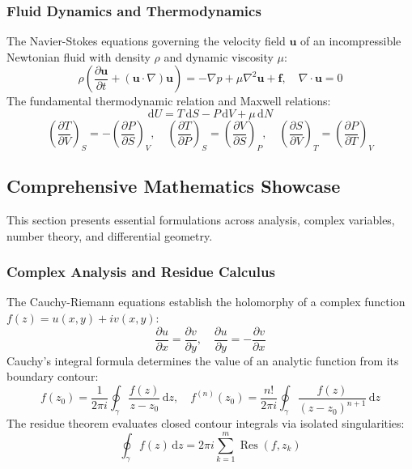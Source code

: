\documentclass[11pt, a4paper]{article}
\begin{document}
\subsubsection{Fluid Dynamics and Thermodynamics}
The Navier-Stokes equations governing the velocity field $\mathbf{u}$ of an incompressible Newtonian fluid with density $\rho$ and dynamic viscosity $\mu$:
\begin{equation}
\rho \left( \frac{\partial \mathbf{u}}{\partial t} + (\mathbf{u} \cdot \nabla) \mathbf{u} \right) = -\nabla p + \mu \nabla^2 \mathbf{u} + \mathbf{f}, \quad \nabla \cdot \mathbf{u} = 0
\end{equation}
The fundamental thermodynamic relation and Maxwell relations:
\begin{equation}
\mathrm{d}U = T \, \mathrm{d}S - P \, \mathrm{d}V + \mu \, \mathrm{d}N
\end{equation}
\begin{equation}
\left( \frac{\partial T}{\partial V} \right)_S = -\left( \frac{\partial P}{\partial S} \right)_V, \quad \left( \frac{\partial T}{\partial P} \right)_S = \left( \frac{\partial V}{\partial S} \right)_P, \quad \left( \frac{\partial S}{\partial V} \right)_T = \left( \frac{\partial P}{\partial T} \right)_V
\end{equation}

\subsection{Comprehensive Mathematics Showcase}
This section presents essential formulations across analysis, complex variables, number theory, and differential geometry.

\subsubsection{Complex Analysis and Residue Calculus}
The Cauchy-Riemann equations establish the holomorphy of a complex function $f(z) = u(x, y) + i v(x, y)$:
\begin{equation}
\frac{\partial u}{\partial x} = \frac{\partial v}{\partial y}, \quad \frac{\partial u}{\partial y} = -\frac{\partial v}{\partial x}
\end{equation}
Cauchy's integral formula determines the value of an analytic function from its boundary contour:
\begin{equation}
f(z_0) = \frac{1}{2\pi i} \oint_\gamma \frac{f(z)}{z - z_0} \, \mathrm{d}z, \quad f^{(n)}(z_0) = \frac{n!}{2\pi i} \oint_\gamma \frac{f(z)}{(z - z_0)^{n+1}} \, \mathrm{d}z
\end{equation}
The residue theorem evaluates closed contour integrals via isolated singularities:
\begin{equation}
\oint_\gamma f(z) \, \mathrm{d}z = 2\pi i \sum_{k=1}^m \operatorname{Res}(f, z_k)
\end{equation}
\end{document}
